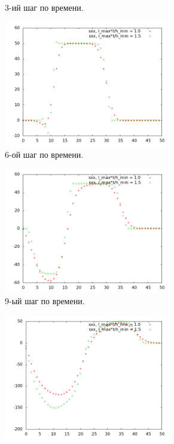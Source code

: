 \begin{figure}[htp]
\begin{subfigure}[b]{0.5\textwidth}
\caption{3-ий шаг по времени.}
\end{subfigure}
\begin{subfigure}[b]{0.5\textwidth}
\centering
\includegraphics[width=0.8\textwidth]{png/big-sigma-test-results-1d/snap-6.png}
\caption{6-ой шаг по времени.}
\end{subfigure}
\begin{subfigure}[b]{0.5\textwidth}
\centering
\includegraphics[width=0.8\textwidth]{png/big-sigma-test-results-1d/snap-9.png}
\caption{9-ый шаг по времени.}
\end{subfigure}
\begin{subfigure}[b]{0.5\textwidth}
\centering
\includegraphics[width=0.8\textwidth]{png/big-sigma-test-results-1d/snap-12.png}

\end{subfigure}
\end{figure}
